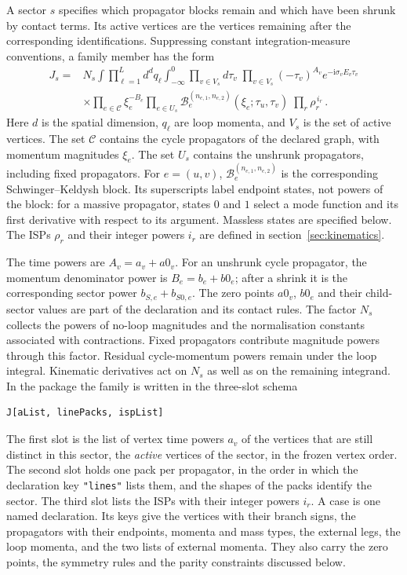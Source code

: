 \documentclass[11pt,a4paper]{article}
\begin{document}
A sector $s$ specifies which propagator blocks remain and which have been shrunk by contact
terms. Its active vertices are the vertices remaining after the corresponding identifications.
Suppressing constant integration-measure conventions, a family member has the form
\begin{equation}
\begin{split}
J_s={}&N_s\!\int\prod_{\ell=1}^{L}d^dq_\ell
\int_{-\infty}^{0}\prod_{v\in V_s}d\tau_v\;
\prod_{v\in V_s}(-\tau_v)^{A_v}e^{-\mathrm{i}\sigma_v E_v\tau_v}\\
&\times\prod_{e\in\mathcal C}\xi_e^{-B_e}
\prod_{e\in U_s}\mathcal B_e^{(n_{e,1},n_{e,2})}
(\xi_e;\tau_u,\tau_v)\;
\prod_r\rho_r^{\,i_r}\,.
\end{split}
\label{eq:family}
\end{equation}
Here $d$ is the spatial dimension, $q_\ell$ are loop momenta, and $V_s$ is the set of active
vertices. The set $\mathcal C$ contains the cycle propagators of the declared graph, with momentum
magnitudes $\xi_e$. The set $U_s$ contains the unshrunk propagators, including fixed propagators.
For $e=(u,v)$, $\mathcal B_e^{(n_{e,1},n_{e,2})}$ is the corresponding Schwinger--Keldysh block.
Its superscripts label endpoint states, not powers of the block: for a massive propagator,
states $0$ and $1$ select a mode function and its first derivative with respect to its argument.
Massless states are specified below. The ISPs $\rho_r$ and their integer powers $i_r$ are defined
in section~\ref{sec:kinematics}.

The time powers are $A_v=a_v+a0_v$. For an unshrunk cycle propagator, the momentum denominator
power is $B_e=b_e+b0_e$; after a shrink it is the corresponding sector power
$b_{S,e}+b_{S0,e}$. The zero points $a0_v$, $b0_e$ and their child-sector values are part of the
declaration and its contact rules. The factor $N_s$ collects the powers of no-loop magnitudes
and the normalisation constants associated with contractions. Fixed propagators contribute
magnitude powers through this factor. Residual cycle-momentum powers remain under the loop
integral. Kinematic derivatives act on $N_s$ as well as on the remaining integrand.
In the package the family is written in the three-slot schema
\begin{verbatim}
J[aList, linePacks, ispList]
\end{verbatim}
The first slot is the list of vertex time powers $a_v$ of the vertices that are still distinct in
this sector, the \emph{active} vertices of the sector, in the frozen vertex order. The second slot
holds one pack per propagator, in the order
in which the declaration key \texttt{"lines"} lists them, and the shapes of the packs identify the
sector. The third slot lists the ISPs with their integer powers $i_r$. A case is one named
declaration. Its keys give the vertices with their branch signs, the propagators with their
endpoints, momenta and mass types, the external legs, the loop momenta, and the two lists of
external momenta. They also carry the zero points, the symmetry rules and the parity constraints
discussed below.
\end{document}
